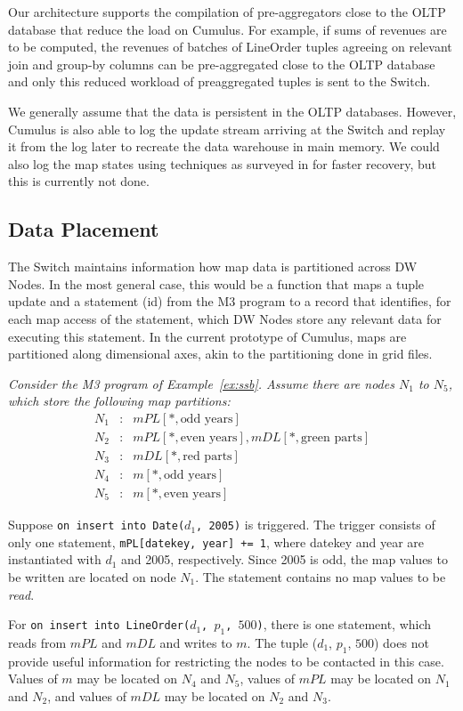 Our architecture supports the compilation of pre-aggrega\-tors close to the
OLTP database that reduce the load on Cumulus. For example, if sums of revenues
are to be computed, the revenues of batches of LineOrder tuples agreeing
on relevant join and group-by columns can be pre-aggregated close to the OLTP database and only this reduced workload of preaggregated tuples is sent to the Switch.

We generally assume that the data is persistent in the OLTP databases.
However, Cumulus is also able to
log the update stream arriving at the Switch and replay it from the
log later to recreate the data warehouse in main memory.
We could also log the map states using techniques as surveyed in
\cite{DBLP:journals/pvldb/SallesCSDGKW09}
for faster recovery, but this is currently not done.



\subsection{Data Placement}


The Switch maintains information how map data is partitioned across
DW Nodes. In the most general case, this would be a function
that maps a tuple update and a statement (id) from the M3 program to
a record that identifies, for each map access of the statement,
which DW Nodes store any relevant data for executing this
statement.
%
In the current prototype of Cumulus, maps are partitioned along
dimensional axes, akin to the partitioning done in grid files\cite{318586}.


\begin{example}\em
\label{ex:switch_msg}
Consider the M3 program of Example~\ref{ex:ssb}.
Assume there are nodes $N_1$ to $N_5$,
which store the following map partitions:
\begin{eqnarray*}
N_1 &:& mPL[*, \mbox{odd years}] \\
N_2 &:& mPL[*, \mbox{even years}], mDL[*, \mbox{green parts}] \\ 
N_3 &:& mDL[*, \mbox{red parts}] \\ 
N_4 &:& m[*, \mbox{odd years}] \\
N_5 &:& m[*, \mbox{even years}]
\end{eqnarray*}

Suppose {\tt on insert into Date($d_1$, 2005)} is triggered.
The trigger consists of only one statement,
{\tt mPL[datekey, year] += 1}, where datekey and year are instantiated
with $d_1$ and 2005, respectively. Since 2005 is odd,
the map values to be written are located on node $N_1$.
The statement contains no map values to be {\em read}.

For {\tt on insert into LineOrder($d_1$, $p_1$, $500$)},
there is one statement, which reads from $mPL$ and $mDL$ and writes to $m$.
The tuple ($d_1$, $p_1$, $500$)
does not provide useful information for restricting the nodes to be contacted
in this case.
Values of $m$ may be located on $N_4$ and $N_5$, values of $mPL$ may be
located on $N_1$ and $N_2$, and values of $mDL$ may be located on $N_2$ and
$N_3$.
\punto
\end{example}


